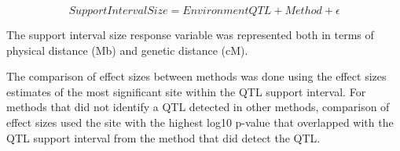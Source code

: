 \documentclass[article,9pt,twocolumn,twoside]{rilabRxiv}
\begin{document}
\begin{equation}
\label{eqn:bounds}
 Support Interval Size = Environment QTL + Method + \epsilon
\end{equation}

The support interval size response variable was represented both in terms of physical distance (Mb) and genetic distance (cM).

The comparison of effect sizes between methods was done using the effect sizes estimates of the most significant site within the QTL support interval. For methods that did not identify a QTL detected in other methods, comparison of effect sizes used the site with the highest log10 p-value that overlapped with the QTL support interval from the method that did detect the QTL.




\end{document}
